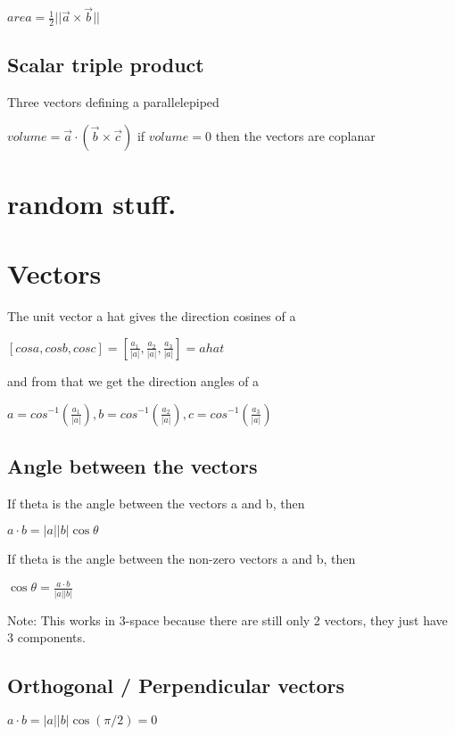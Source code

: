 \documentclass{extarticle}
\begin{document}
\begin{multicols}{4}
$area =\frac{1}{2}||\vec{a}\times \vec{b}||$

\subsection{Scalar triple product}
Three vectors defining a parallelepiped

$volume=\vec{a}\cdot(\vec{b}\times \vec{c})$
if $volume=0$ then the vectors are coplanar

\section{random stuff.}
\section{Vectors}

\begin{tcolorbox}[enhanced jigsaw,sharp corners,coltext=black,colback=Red!25!white,boxrule=0pt,breakable,size=minimal]
The unit vector a hat gives the direction cosines of a

$[cos a,cos b,cos c]=[\frac{a_1}{|a|},\frac{a_2}{|a|},\frac{a_3}{|a|}]= a hat$

and from that we get the direction angles of a

$a=cos^{-1}(\frac{a_1}{|a|}), b=cos^{-1}(\frac{a_2}{|a|}), c=cos^{-1}(\frac{a_3}{|a|})$
\end{tcolorbox}

\subsection{Angle between the vectors}

If theta is the angle between the vectors a and b, then

$a\cdot b=\left|a\right|\left|b\right|\cos{\theta}$

If theta is the angle between the non-zero vectors a and b, then

$\cos{\theta}=\frac{a\cdot b}{\left|a\right|\left|b\right|}$

Note: This works in 3-space because there are still only 2 vectors, they just have 3 components.

\subsection{Orthogonal / Perpendicular vectors}

$a\cdot b=\left|a\right|\left|b\right|\cos{\left(\pi/2\right)}=0$


\end{multicols}
\end{document}
